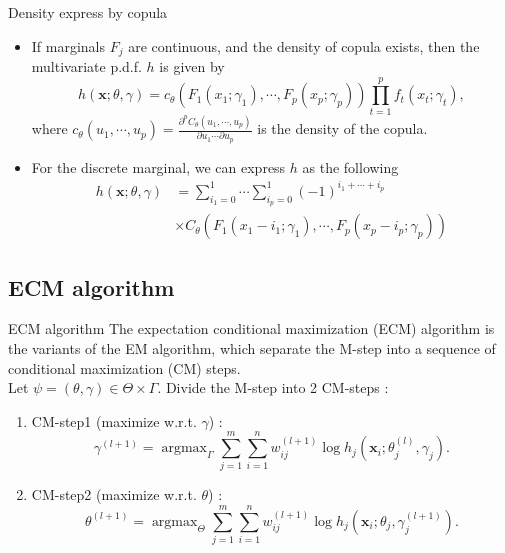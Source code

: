 \documentclass{beamer}
\DeclareMathOperator*{\argmax}{argmax}
\begin{document}
\begin{frame}{Density express by copula}
    \begin{itemize}
        \item If marginals $F_j$ are continuous, and the density of copula exists, then the multivariate p.d.f. $h$ is given by
        \begin{equation*}
            h(\mathbf{x};\theta,\gamma) = c_\theta(F_1(x_1;\gamma_1),\cdots,F_p(x_p;\gamma_p)) \prod_{t=1}^p f_t(x_t;\gamma_t),
        \end{equation*}
        where $c_\theta(u_1,\cdots,u_p)=\frac{\partial^p C_\theta(u_1,\cdots,u_p)}{\partial u_1 \cdots \partial u_p}$ is the density of the copula.

        \item For the discrete marginal, we can express $h$ as the following
        \begin{align*}
            h(\mathbf{x};\theta,\gamma) &= \sum_{i_1=0}^1 \cdots \sum_{i_p=0}^1 (-1)^{i_1+\cdots+i_p} \\
            &\times C_\theta(F_1(x_1-i_1;\gamma_1),\cdots,F_p(x_p-i_p;\gamma_p))
        \end{align*}
    \end{itemize}
\end{frame}


\subsection{ECM algorithm}

\begin{frame}{ECM algorithm}
    The expectation conditional maximization (ECM) algorithm is the variants of the EM algorithm, which separate the M-step into a sequence of conditional maximization (CM) steps.\\
    \bigskip
    Let $\psi=(\theta,\gamma) \in \Theta \times \Gamma$. Divide the M-step into 2 CM-steps :
    \begin{enumerate}
        \item CM-step1 (maximize w.r.t. $\gamma$) :
        \begin{equation*}
            \gamma^{(l+1)} = \argmax_\Gamma \sum_{j=1}^m \sum_{i=1}^n w_{ij}^{(l+1)} \log h_j(\mathbf{x}_i;\theta_j^{(l)},\gamma_j).
        \end{equation*}

        \item CM-step2 (maximize w.r.t. $\theta$) :
        \begin{equation*}
            \theta^{(l+1)} = \argmax_\Theta \sum_{j=1}^m \sum_{i=1}^n w_{ij}^{(l+1)} \log h_j(\mathbf{x}_i;\theta_j,\gamma_j^{(l+1)}).
        \end{equation*}
    \end{enumerate}
\end{frame}
\end{document}
